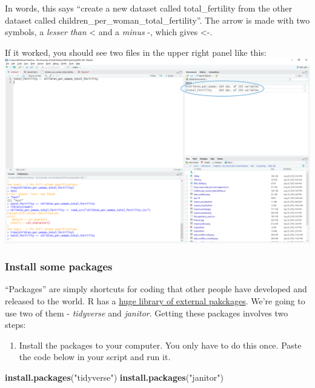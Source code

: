 \documentclass[]{article}
\newenvironment{Shaded}{\begin{snugshade}}{\end{snugshade}}
\newcommand{\KeywordTok}[1]{\textcolor[rgb]{0.13,0.29,0.53}{\textbf{#1}}}
\newcommand{\StringTok}[1]{\textcolor[rgb]{0.31,0.60,0.02}{#1}}
\newcommand{\NormalTok}[1]{#1}
\providecommand{\tightlist}{%
  \setlength{\itemsep}{0pt}\setlength{\parskip}{0pt}}
\begin{document}
In words, this says ``create a new dataset called total\_fertility from
the other dataset called children\_per\_woman\_total\_fertility''. The
arrow is made with two symbols, a \emph{lesser than} \textless{} and a
\emph{minus} -, which gives \textless{}-.

If it worked, you should see two files in the upper right panel like
this: \includegraphics{first_code.png}

\subsubsection{Install some packages}\label{install-some-packages}

``Packages'' are simply shortcuts for coding that other people have
developed and released to the world. R has a
\href{https://cran.r-project.org/web/packages/available_packages_by_name.html\%20of\%20external\%20packages}{huge
library of external pakckages}. We're going to use two of them -
\emph{tidyverse} and \emph{janitor}. Getting these packages involves two
steps:

\begin{enumerate}
\def\labelenumi{\arabic{enumi})}
\tightlist
\item
  Install the packages to your computer. You only have to do this once.
  Paste the code below in your script and run it.
\end{enumerate}

\begin{Shaded}
\begin{Highlighting}[]
\KeywordTok{install.packages}\NormalTok{(}\StringTok{"tidyverse"}\NormalTok{)}
\KeywordTok{install.packages}\NormalTok{(}\StringTok{"janitor"}\NormalTok{)}
\end{Highlighting}
\end{Shaded}
\end{document}
